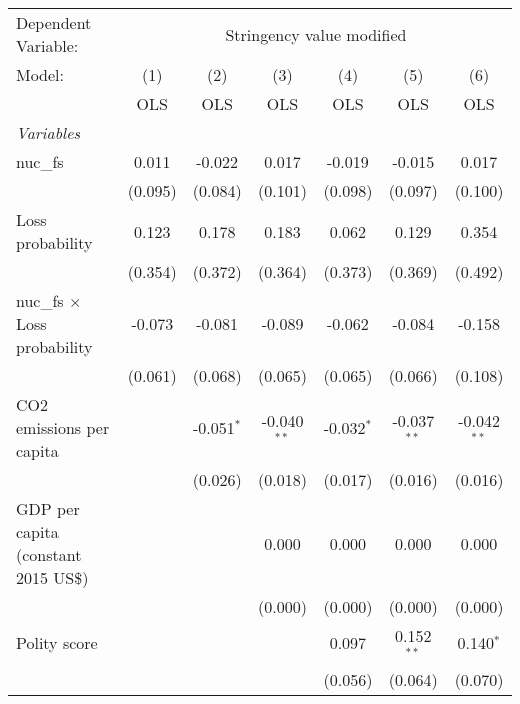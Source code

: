 
\begingroup
\centering
\begin{tabular}{lcccccc}
   \toprule
   Dependent Variable: & \multicolumn{6}{c}{Stringency value modified}\\
   Model:                               & (1)     & (2)          & (3)           & (4)          & (5)           & (6)\\  
                                        &  OLS    & OLS          & OLS           & OLS          & OLS           & OLS\\  
   \midrule
   \emph{Variables}\\
   nuc\_fs                              & 0.011   & -0.022       & 0.017         & -0.019       & -0.015        & 0.017\\   
                                        & (0.095) & (0.084)      & (0.101)       & (0.098)      & (0.097)       & (0.100)\\   
   Loss probability                     & 0.123   & 0.178        & 0.183         & 0.062        & 0.129         & 0.354\\   
                                        & (0.354) & (0.372)      & (0.364)       & (0.373)      & (0.369)       & (0.492)\\   
   nuc\_fs $\times$ Loss probability    & -0.073  & -0.081       & -0.089        & -0.062       & -0.084        & -0.158\\   
                                        & (0.061) & (0.068)      & (0.065)       & (0.065)      & (0.066)       & (0.108)\\   
   CO2 emissions per capita             &         & -0.051$^{*}$ & -0.040$^{**}$ & -0.032$^{*}$ & -0.037$^{**}$ & -0.042$^{**}$\\   
                                        &         & (0.026)      & (0.018)       & (0.017)      & (0.016)       & (0.016)\\   
   GDP per capita (constant 2015 US\$)  &         &              & 0.000         & 0.000        & 0.000         & 0.000\\   
                                        &         &              & (0.000)       & (0.000)      & (0.000)       & (0.000)\\   
   Polity score                         &         &              &               & 0.097        & 0.152$^{**}$  & 0.140$^{*}$\\   
                                        &         &              &               & (0.056)      & (0.064)       & (0.070)\\   

\end{tabular}
